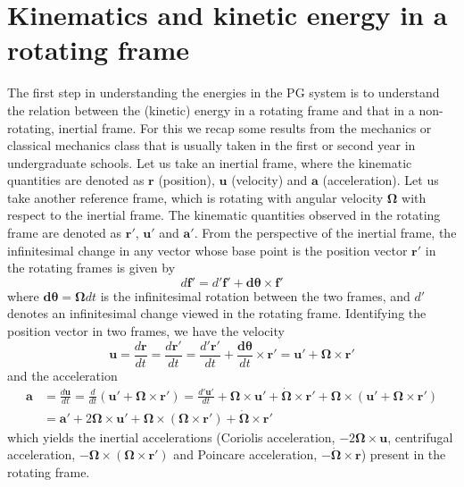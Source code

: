 \section{Kinematics and kinetic energy in a rotating frame}

The first step in understanding the energies in the PG system is to understand the relation between the (kinetic) energy in a rotating frame and that in a non-rotating, inertial frame.
For this we recap some results from the mechanics or classical mechanics class that is usually taken in the first or second year in undergraduate schools.
Let us take an inertial frame, where the kinematic quantities are denoted as $\mathbf{r}$ (position), $\mathbf{u}$ (velocity) and $\mathbf{a}$ (acceleration). Let us take another reference frame, which is rotating with angular velocity $\boldsymbol{\Omega}$ with respect to the inertial frame. The kinematic quantities observed in the rotating frame are denoted as $\mathbf{r}'$, $\mathbf{u}'$ and $\mathbf{a}'$. From the perspective of the inertial frame, the infinitesimal change in any vector whose base point is the position vector $\mathbf{r}'$ in the rotating frames is given by
%
\begin{equation}
    d\mathbf{f}' = d'\mathbf{f}' + \mathbf{d}\boldsymbol{\theta} \times \mathbf{f}'
\end{equation}
%
where $\mathbf{d}\boldsymbol{\theta} = \boldsymbol{\Omega} dt$ is the infinitesimal rotation between the two frames, and $d'$ denotes an infinitesimal change viewed in the rotating frame. Identifying the position vector in two frames, we have the velocity
%
\begin{equation}
    \mathbf{u} = \frac{d\mathbf{r}}{dt} = \frac{d \mathbf{r}'}{dt} = \frac{d' \mathbf{r}'}{dt} + \frac{\mathbf{d}\boldsymbol{\theta}}{dt}\times \mathbf{r}' = \mathbf{u}' + \boldsymbol{\Omega}\times \mathbf{r}'
\end{equation}
%
and the acceleration
%
\begin{equation}
\begin{aligned}
    \mathbf{a} &= \frac{d\mathbf{u}}{dt} = \frac{d}{dt} (\mathbf{u}' + \boldsymbol{\Omega}\times \mathbf{r}') = \frac{d'\mathbf{u'}}{dt} + \boldsymbol{\Omega} \times \mathbf{u}' + \dot{\boldsymbol{\Omega}}\times \mathbf{r}' + \boldsymbol{\Omega}\times (\mathbf{u}' + \boldsymbol{\Omega}\times \mathbf{r}') \\ 
    &= \mathbf{a}' + 2 \boldsymbol{\Omega} \times \mathbf{u}' + \boldsymbol{\Omega}\times (\boldsymbol{\Omega}\times \mathbf{r}') + \dot{\boldsymbol{\Omega}}\times \mathbf{r}'
\end{aligned}
\end{equation}
%
which yields the inertial accelerations (Coriolis acceleration, $-2\boldsymbol{\Omega}\times \mathbf{u}$, centrifugal acceleration, $-\boldsymbol{\Omega}\times (\boldsymbol{\Omega}\times \mathbf{r}')$ and Poincare acceleration, $-\dot{\boldsymbol{\Omega}}\times \mathbf{r}$) present in the rotating frame.

